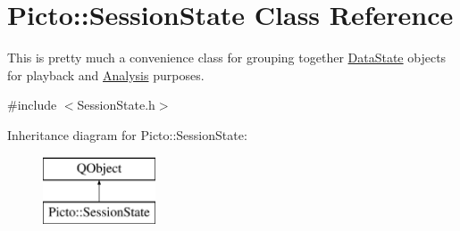 \hypertarget{class_picto_1_1_session_state}{\section{Picto\-:\-:Session\-State Class Reference}
\label{class_picto_1_1_session_state}
}


This is pretty much a convenience class for grouping together \hyperlink{class_picto_1_1_data_state}{Data\-State} objects for playback and \hyperlink{class_picto_1_1_analysis}{Analysis} purposes.  




{\ttfamily \#include $<$Session\-State.\-h$>$}

Inheritance diagram for Picto\-:\-:Session\-State\-:\begin{figure}[H]
\begin{center}
\leavevmode
\includegraphics[height=2.000000cm]{class_picto_1_1_session_state}
\end{center}
\end{figure}

